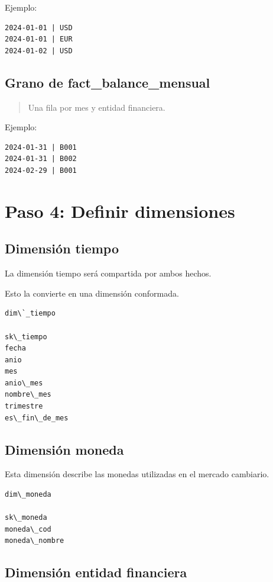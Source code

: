 Ejemplo:

\begin{verbatim}
2024-01-01 | USD
2024-01-01 | EUR
2024-01-02 | USD
\end{verbatim}

\subsection{Grano de fact\_balance\_mensual}

\begin{quote}
Una fila por mes y entidad financiera.
\end{quote}

Ejemplo:

\begin{verbatim}
2024-01-31 | B001
2024-01-31 | B002
2024-02-29 | B001
\end{verbatim}

\section{Paso 4: Definir dimensiones}

\subsection{Dimensión tiempo}

La dimensión tiempo será compartida por ambos hechos.

Esto la convierte en una dimensión conformada.

\begin{verbatim}
dim\`_tiempo

sk\_tiempo
fecha
anio
mes
anio\_mes
nombre\_mes
trimestre
es\_fin\_de_mes
\end{verbatim}

\subsection{Dimensión moneda}

Esta dimensión describe las monedas utilizadas en el mercado cambiario.

\begin{verbatim}
dim\_moneda

sk\_moneda
moneda\_cod
moneda\_nombre
\end{verbatim}

\subsection{Dimensión entidad financiera}

